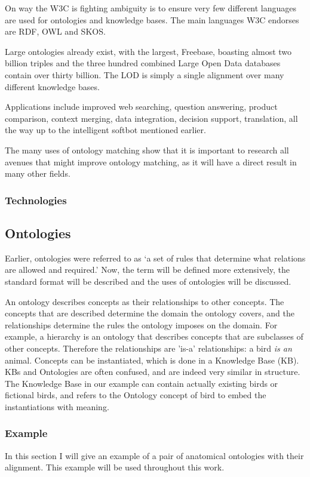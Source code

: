 \documentclass{article}
\begin{document}
 On way the W3C is fighting ambiguity is to ensure very few different languages are used for ontologies and knowledge bases. The main languages W3C endorses are RDF, OWL and SKOS\cite{rdf, owl, skos}. 
 
 Large ontologies already exist, with the largest, Freebase, boasting almost two billion triples and the three hundred combined Large Open Data databases contain over thirty billion\cite{dbpedia, lod}. The LOD is simply a single alignment over many different knowledge bases.
 
 Applications include improved web searching, question answering, product comparison, context merging, data integration, decision support, translation, all the way up to the intelligent softbot mentioned earlier. \cite{schreiber, future}
 
 The many uses of ontology matching show that it is important to research all avenues that might improve ontology matching, as it will have a direct result in many other fields.
 \subsubsection{Technologies}
 
 \subsection{Ontologies}
 Earlier, ontologies were referred to as `a set of rules that determine what relations are allowed and required.' Now, the term will be defined more extensively, the standard format will be described and the uses of ontologies will be discussed.
 
 An ontology describes concepts as their relationships to other concepts. The concepts that are described determine the domain the ontology covers, and the relationships determine the rules the ontology imposes on the domain. For example, a hierarchy is an ontology that describes concepts that are subclasses of other concepts. Therefore the relationships are 'is-a' relationships: a bird \emph{is an} animal.
 Concepts can be instantiated, which is done in a Knowledge Base (KB). KBs and Ontologies are often confused, and are indeed very similar in structure. The Knowledge Base in our example can contain actually existing birds or fictional birds, and refers to the Ontology concept of bird to embed the instantiations with meaning\cite{ontologyGuru}.
 
 \subsubsection{Example} \label{example}
 In this section I will give an example of a pair of anatomical ontologies with their alignment. This example will be used throughout this work.
 
\end{document}

